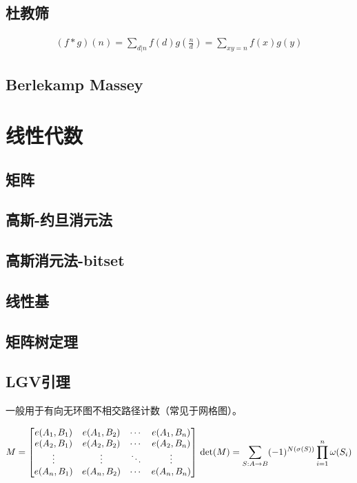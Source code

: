 \documentclass{article}
\begin{document}
\subsection{杜教筛}

$$
\begin{aligned}
(f*g)(n)=\underset{d|n}{\sum} f(d)g(\frac{n}{d})=\underset{xy=n}{\sum} f(x)g(y)
\end{aligned}
$$

\subsection{Berlekamp Massey}


\section{线性代数}
\subsection{矩阵}

\subsection{高斯-约旦消元法}

\subsection{高斯消元法-bitset}

\subsection{线性基}

\subsection{矩阵树定理}

\subsection{LGV引理}
一般用于有向无环图不相交路径计数（常见于网格图）。

$$
M = \begin{bmatrix}e(A_1,B_1)&e(A_1,B_2)&\cdots&e(A_1,B_n)\\ 
e(A_2,B_1)&e(A_2,B_2)&\cdots&e(A_2,B_n)\\ 
\vdots&\vdots&\ddots&\vdots\\ 
e(A_n,B_1)&e(A_n,B_2)&\cdots&e(A_n,B_n)\end{bmatrix}\\ 
\det(M)=\sum\limits_{S:A\rightarrow B}(-1)^{N(\sigma(S))}\prod\limits_{i=1}^n \omega(S_i)
$$
\end{document}
